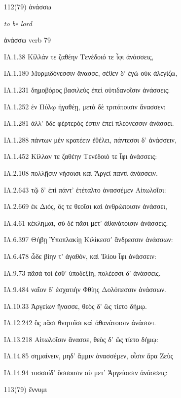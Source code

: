 \begin{enumerate}
{ΙΛ.13.457 ἂψ ἀναχωρήσας, ἦ πειρήσαιτο καὶ οἶος.

ΙΛ.13.806 πάντῃ δ' ἀμφὶ φάλαγγας ἐπειρᾶτο προποδίζων,

}

\clearpage
\item[\large 112(79)]{\large \g ἀνάσσω}

\hspace{0.2cm} \textit{ to be lord }

{	ἀνάσσω	verb	79

ΙΛ.1.38 Κίλλάν τε ζαθέην Τενέδοιό τε ἶφι ἀνάσσεις,

ΙΛ.1.180 Μυρμιδόνεσσιν ἄνασσε, σέθεν δ' ἐγὼ οὐκ ἀλεγίζω,

ΙΛ.1.231 δημοβόρος βασιλεὺς ἐπεὶ οὐτιδανοῖσιν ἀνάσσεις:

ΙΛ.1.252 ἐν Πύλῳ ἠγαθέῃ, μετὰ δὲ τριτάτοισιν ἄνασσεν:

ΙΛ.1.281 ἀλλ' ὅδε φέρτερός ἐστιν ἐπεὶ πλεόνεσσιν ἀνάσσει.

ΙΛ.1.288 πάντων μὲν κρατέειν ἐθέλει, πάντεσσι δ' ἀνάσσειν,

ΙΛ.1.452 Κίλλαν τε ζαθέην Τενέδοιό τε ἶφι ἀνάσσεις:

ΙΛ.2.108 πολλῇσιν νήσοισι καὶ Ἄργεϊ παντὶ ἀνάσσειν.

ΙΛ.2.643 τῷ δ' ἐπὶ πάντ' ἐτέταλτο ἀνασσέμεν Αἰτωλοῖσι:

ΙΛ.2.669 ἐκ Διός, ὅς τε θεοῖσι καὶ ἀνθρώποισιν ἀνάσσει,

ΙΛ.4.61 κέκλημαι, σὺ δὲ πᾶσι μετ' ἀθανάτοισιν ἀνάσσεις.

ΙΛ.6.397 Θήβῃ Ὑποπλακίῃ Κιλίκεσσ' ἄνδρεσσιν ἀνάσσων:

ΙΛ.6.478 ὧδε βίην τ' ἀγαθόν, καὶ Ἰλίου ἶφι ἀνάσσειν:

ΙΛ.9.73 πᾶσά τοί ἐσθ' ὑποδεξίη, πολέεσσι δ' ἀνάσσεις.

ΙΛ.9.484 ναῖον δ' ἐσχατιὴν Φθίης Δολόπεσσιν ἀνάσσων.

ΙΛ.10.33 Ἀργείων ἤνασσε, θεὸς δ' ὣς τίετο δήμῳ.

ΙΛ.12.242 ὃς πᾶσι θνητοῖσι καὶ ἀθανάτοισιν ἀνάσσει.

ΙΛ.13.218 Αἰτωλοῖσιν ἄνασσε, θεὸς δ' ὣς τίετο δήμῳ:

ΙΛ.14.85 σημαίνειν, μηδ' ἄμμιν ἀνασσέμεν, οἷσιν ἄρα Ζεὺς

ΙΛ.14.94 τοσσοίδ' ὅσσοισιν σὺ μετ' Ἀργείοισιν ἀνάσσεις:

}

\clearpage
\item[\large 113(79)]{\large \g ἕννυμι}


\end{enumerate}
